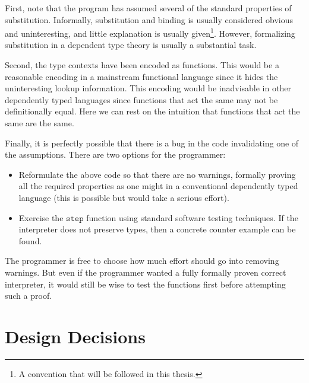 First, note that the program has assumed several of the standard properties of substitution.
Informally, substitution and binding is usually considered obvious and uninteresting, and little explanation is usually given\footnote{
  A convention that will be followed in this thesis.
}.
However, formalizing substitution in a dependent type theory is usually a substantial task\cite{10.1145/3293880.3294101}.

Second, the type contexts have been encoded as functions.
This would be a reasonable encoding in a mainstream functional language since it hides the uninteresting lookup information.
This encoding would be inadvisable in other dependently typed languages since functions that act the same may not be definitionally equal. %
Here we can rest on the intuition that functions that act the same are the same.

Finally, it is perfectly possible that there is a bug in the code invalidating one of the assumptions.
There are two options for the programmer:
\begin{itemize}
\item Reformulate the above code so that there are no warnings, formally proving all the required properties as one might in a conventional dependently typed language (this is possible but would take a serious effort).
\item Exercise the $\mathtt{step}$ function using standard software testing techniques.
If the interpreter does not preserve types, then a concrete counter example can be found.
\end{itemize}
The programmer is free to choose how much effort should go into removing warnings.
But even if the programmer wanted a fully formally proven correct interpreter, it would still be wise to test the functions first before attempting such a proof.



\section{Design Decisions}

